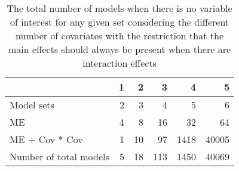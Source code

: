 \begin{table}[!h]
\centering
\caption{The total number of models when there is no variable of interest for any given set considering the different number of covariates with the restriction that the main effects should always be present when there are interaction effects} 
\begin{tabular}{lrrrrr}
  \hline
 & 1 & 2 & 3 & 4 & 5 \\ 
  \hline
Model sets & 2 & 3 & 4 & 5 & 6 \\ 
  ME & 4 & 8 & 16 & 32 & 64 \\ 
  ME + Cov * Cov & 1 & 10 & 97 & 1418 & 40005 \\ 
  Number of total models & 5 & 18 & 113 & 1450 & 40069 \\ 
   \hline
\end{tabular}
\end{table}
